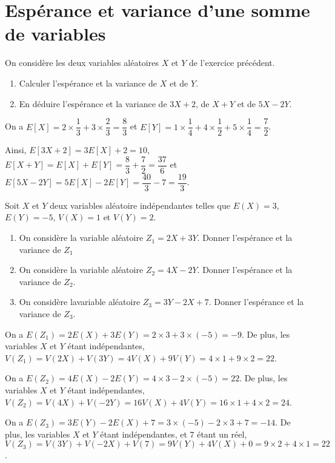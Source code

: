 \documentclass[11pt,fleqn, openany]{book} %
\begin{document}

\section*{Espérance et variance d'une somme de variables}

\begin{exercise}[topic=lgn02]On considère les deux variables aléatoires $X$ et $Y$ de l'exercice précédent.
\begin{enumerate}
\item Calculer l'espérance et la variance de $X$ et de $Y$.
\item En déduire l'espérance et la variance de $3X+2$, de $X+Y$ et de $5X-2Y$.
\end{enumerate}\end{exercise}

\begin{solution}On a $E[X]=2 \times \dfrac{1}{3} + 3 \times \dfrac{2}{3} = \dfrac{8}{3}$ et $E[Y]=1 \times \dfrac{1}{4}+4 \times \dfrac{1}{2} + 5 \times \dfrac{1}{4}= \dfrac{7}{2}$.

Ainsi, $E[3X+2]=3E[X]+2=10$, $E[X+Y]=E[X]+E[Y]=\dfrac{8}{3}+\dfrac{7}{2}= \dfrac{37}{6}$ et \\$E[5X-2Y]=5E[X]-2E[Y]=\dfrac{40}{3}-7=\dfrac{19}{3}$.\end{solution}




\begin{exercise}[topic=lgn02]
Soit $X$ et $Y$ deux variables aléatoire indépendantes telles que $E(X)=3$, $E(Y)=-5$, $V(X)=1$ et $V(Y)=2$.
\begin{enumerate}
\item On considère la variable aléatoire $Z_1=2X+3Y$. Donner l'espérance et la variance de $Z_1$
\item On considère la variable aléatoire $Z_2=4X-2Y$. Donner l'espérance et la variance de $Z_2$.
\item On considère lavariable aléatoire $Z_3=3Y-2X+7$. Donner l'espérance et la variance de $Z_3$.
\end{enumerate}\end{exercise}

\begin{solution}On a $E(Z_1)=2E(X)+3E(Y)=2 \times 3 + 3 \times (-5)=-9$. De plus, les variables $X$ et $Y$ étant indépendantes, $V(Z_1)=V(2X)+V(3Y)=4V(X)+9V(Y)=4 \times 1 + 9 \times 2 = 22$.

On a $E(Z_2)=4E(X)-2E(Y)=4 \times 3 -2 \times (-5)=22$. De plus, les variables $X$ et $Y$ étant indépendantes, $ V(Z_2)=V(4X)+V(-2Y)=16V(X)+4V(Y)=16 \times 1 + 4 \times 2 = 24$.

On a $E(Z_3)=3E(Y)-2E(X)+7=3 \times (-5) -2 \times 3 + 7 = -14$. De plus, les variables $X$ et $Y$ étant indépendantes, et $7$ étant un réel, $V(Z_3)=V(3Y)+V(-2X)+V(7)=9V(Y)+4V(X)+0=9 \times 2 + 4 \times 1 = 22$.\end{solution}
\end{document}
